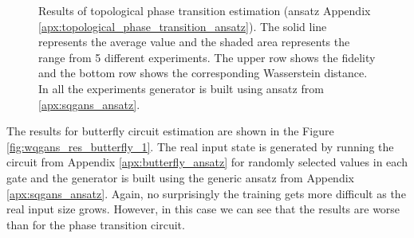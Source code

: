 \begin{figure}[htbp!]
  \caption{Results of topological phase transition estimation (ansatz Appendix \ref{apx:topological_phase_transition_ansatz}).
    The solid line represents the average value and the shaded area
    represents the range from 5 different experiments. The upper row shows the
    fidelity and the bottom row shows the corresponding Wasserstein distance. In all the
    experiments generator is built using ansatz from \ref{apx:sqgans_ansatz}.}
  \label{fig:wqgans_res_1}
\end{figure}


The results for butterfly circuit estimation are shown in the Figure
\ref{fig:wqgans_res_butterfly_1}. The real input state is generated by running
the circuit from Appendix \ref{apx:butterfly_ansatz} for randomly selected
values in each gate and the generator is built using the generic ansatz from Appendix
\ref{apx:sqgans_ansatz}. Again, no surprisingly the training gets more difficult
as the real input size grows. However, in this case we can see that the results
are worse than for the phase transition circuit.


